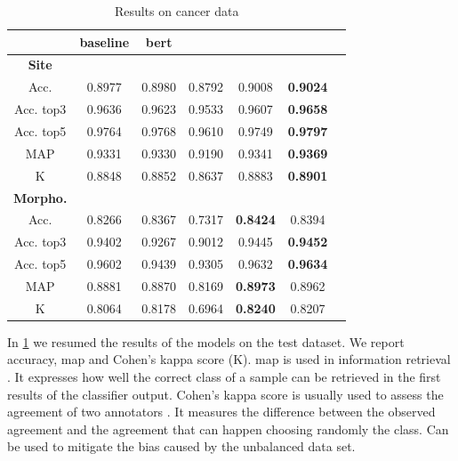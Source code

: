 \begin{table}
  \centering
  \caption{Results on cancer data}
  \label{tab:results}
  \begin{tabular}{|c|c|c|c|c|c|c|}
    \hline
    &baseline&\ac{bert}&\maxi{}&\softmax{}&\maxb{}\\
    \hline
    \hline
    \textbf{Site}&&&&&\\
    Acc.&0.8977&0.8980&0.8792&0.9008&\textbf{0.9024}\\
    Acc. top3&0.9636&0.9623&0.9533&0.9607&\textbf{0.9658}\\
    Acc. top5&0.9764&0.9768&0.9610&0.9749&\textbf{0.9797}\\
    MAP &0.9331&0.9330&0.9190&0.9341&\textbf{0.9369}\\
    K&0.8848&0.8852&0.8637&0.8883&\textbf{0.8901}\\
    \hline
    \hline
    \textbf{Morpho.}&&&&&\\
    Acc.&0.8266&0.8367&0.7317&\textbf{0.8424}&0.8394 \\
    Acc. top3&0.9402&0.9267&0.9012&0.9445&\textbf{0.9452} \\
    Acc. top5&0.9602&0.9439&0.9305&0.9632&\textbf{0.9634} \\
    MAP&0.8881&0.8870&0.8169&\textbf{0.8973}&0.8962 \\
    K&0.8064&0.8178&0.6964&\textbf{0.8240}&0.8207 \\
    \hline
  \end{tabular}
\end{table}
In \cref{tab:results} we resumed the results of the models on the test
dataset. We report accuracy, \ac{map} and Cohen's kappa score (K).
\ac{map} is used in information
retrieval \cite{manning_introduction_2008}. It expresses how well the
correct class of a sample can be retrieved in 
the first results of the classifier output.
Cohen's kappa score is usually used to assess
the agreement of two annotators \cite{cohen_coefficient_1960}. It
measures the difference between the observed agreement and the
agreement that can happen choosing randomly the class. Can be used to
mitigate the bias caused by the unbalanced data set.


